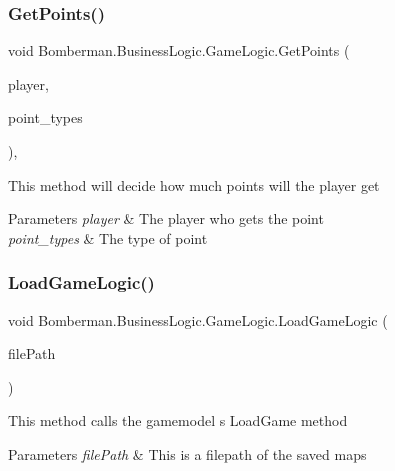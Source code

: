 \subsubsection{\texorpdfstring{GetPoints()}{GetPoints()}}
{\footnotesize\ttfamily void Bomberman.\+Business\+Logic.\+Game\+Logic.\+Get\+Points (\begin{DoxyParamCaption}\item[{\mbox{\hyperlink{class_bomberman_1_1_model_1_1_player}{Player}}}]{player,  }\item[{\mbox{\hyperlink{namespace_bomberman_1_1_model_ae2cd98abbbc849107bf2802cb1e7a8a3}{Point\+Types}}}]{point\+\_\+types }\end{DoxyParamCaption})\hspace{0.3cm}{\ttfamily [inline]}, {\ttfamily [private]}}



This method will decide how much points will the player get 


\begin{DoxyParams}{Parameters}
{\em player} & The player who gets the point\\
\hline
{\em point\+\_\+types} & The type of point\\
\hline
\end{DoxyParams}
\mbox{\label{class_bomberman_1_1_business_logic_1_1_game_logic_a457b06be2502ed585fe15f6dcd5bc367}} 
\subsubsection{\texorpdfstring{LoadGameLogic()}{LoadGameLogic()}}
{\footnotesize\ttfamily void Bomberman.\+Business\+Logic.\+Game\+Logic.\+Load\+Game\+Logic (\begin{DoxyParamCaption}\item[{string}]{file\+Path }\end{DoxyParamCaption})\hspace{0.3cm}{\ttfamily [inline]}}



This method calls the gamemodel s Load\+Game method 


\begin{DoxyParams}{Parameters}
{\em file\+Path} & This is a filepath of the saved maps\\
\hline
\end{DoxyParams}
\mbox{\label{class_bomberman_1_1_business_logic_1_1_game_logic_ae70a97fb33a2469c2914b7b266592ad7}} 
